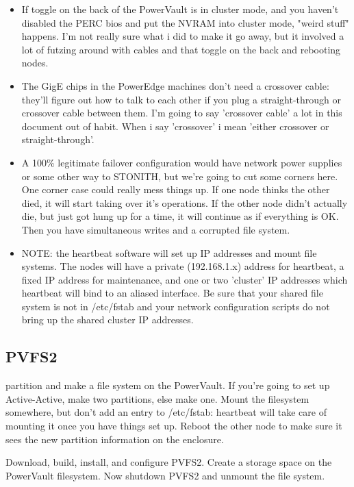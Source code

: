 \documentclass[11pt]{article}
\begin{document}
\begin{itemize}
\item If toggle on the back of the PowerVault is in cluster mode, and you
  haven't disabled the PERC bios and put the NVRAM into cluster mode,
  "weird stuff" happens.   I'm not really sure what i did to make it go
  away, but it involved a lot of futzing around with cables and that
  toggle on the back and rebooting nodes. 

\item The GigE chips in the PowerEdge machines don't need a crossover cable:
  they'll figure out how to talk to each other if you plug a
  straight-through or crossover cable between them.  I'm going to say
  'crossover cable' a lot in this document out of habit.  When i say
  'crossover' i mean 'either crossover or straight-through'.

\item A 100\% legitimate failover configuration would have network power
  supplies or some other way to STONITH, but we're going to cut some
  corners here.  One corner case could really mess things up.  If one
  node thinks the other died, it will start taking over it's operations.
  If the other node didn't actually die, but just got hung up for a
  time, it will continue as if everything is OK.  Then you have
  simultaneous writes and a corrupted file system.

\item NOTE: the heartbeat software will set up IP addresses and mount file
  systems.  The nodes will have a private (192.168.1.x) address for
  heartbeat, a fixed IP address for maintenance, and one or two
  'cluster' IP addresses which heartbeat will bind to an aliased
  interface.  Be sure that your shared file system is not in /etc/fstab
  and your network configuration scripts do not bring up the shared
  cluster IP addresses.  
\end{itemize}

\subsection{PVFS2}

partition and make a file system on the PowerVault.  If you're going to
set up Active-Active, make two partitions, else make one.  Mount the
filesystem somewhere, but don't add an entry to /etc/fstab: heartbeat
will take care of mounting it once you have things set up.  Reboot the
other node to make sure it sees the new partition information on the
enclosure.

Download, build, install, and configure PVFS2.  Create a storage space
on the PowerVault filesystem.  Now shutdown PVFS2 and unmount the file
system.  
\end{document}
